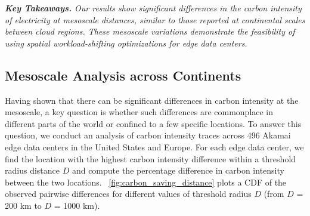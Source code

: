 


\noindent \textit{\textbf{Key Takeaways.} Our results show significant differences in the carbon intensity of electricity at mesoscale distances, similar to those reported at continental scales between cloud regions. These mesoscale variations demonstrate the feasibility of using spatial workload-shifting optimizations for edge data centers.}

\subsection{Mesoscale Analysis across Continents}
Having shown that there can be significant differences in carbon intensity at the mesoscale, a key question is whether such differences are commonplace in different parts of the world or confined to a few specific locations. To answer this question, we conduct an analysis of carbon intensity traces across 496 Akamai edge data centers in the United States and Europe. For each edge data center, we find the location with the highest carbon intensity difference within a threshold radius distance $D$ and compute the percentage difference in carbon intensity between the two locations. ~\autoref{fig:carbon_saving_distance} plots a CDF of the observed pairwise differences for different values of threshold radius $D$ (from $D$ = 200 km to $D$ = 1000 km).


